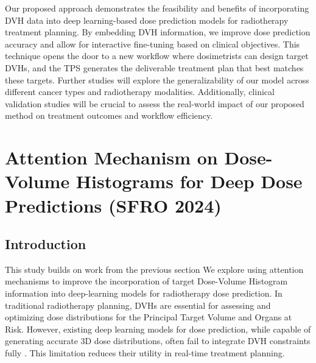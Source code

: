Our proposed approach demonstrates the feasibility and benefits of incorporating DVH data into deep learning-based dose prediction models for radiotherapy treatment planning.
By embedding DVH information, we improve dose prediction accuracy and allow for interactive fine-tuning based on clinical objectives.
This technique opens the door to a new workflow where dosimetrists can design target DVHs, and the TPS generates the deliverable treatment plan that best matches these targets.
Further studies will explore the generalizability of our model across different cancer types and radiotherapy modalities.
Additionally, clinical validation studies will be crucial to assess the real-world impact of our proposed method on treatment outcomes and workflow efficiency.






\section{Attention Mechanism on Dose-Volume Histograms for Deep Dose Predictions (SFRO 2024)}
\subsection{Introduction}
This study builds on work from the previous section
We explore using attention mechanisms to improve the incorporation of target Dose-Volume Histogram information into deep-learning models for radiotherapy dose prediction.
In traditional radiotherapy planning, DVHs are essential for assessing and optimizing dose distributions for the Principal Target Volume and Organs at Risk.
However, existing deep learning models for dose prediction, while capable of generating accurate 3D dose distributions, often fail to integrate DVH constraints fully \cite{Pan2023}.
This limitation reduces their utility in real-time treatment planning.

